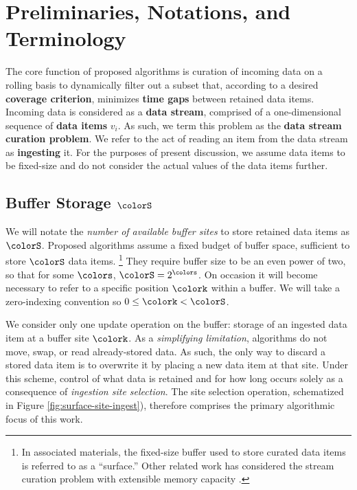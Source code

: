 \section{Preliminaries, Notations, and Terminology} \label{sec:notation}



The core function of proposed algorithms is curation of incoming data on a rolling basis to dynamically filter out a subset that, according to a desired \textbf{coverage criterion}, minimizes \textbf{time gaps} between retained data items.
Incoming data is considered as a \textbf{data stream}, comprised of a one-dimensional sequence of \textbf{data items} $v_i$.
As such, we term this problem as the \textbf{data stream curation problem}.
We refer to the act of reading an item from the data stream as \textbf{ingesting} it.
For the purposes of present discussion, we assume data items to be fixed-size and do not consider the actual values of the data items further.

\subsection{Buffer Storage $\colorS$}

We will notate the \textit{number of available buffer sites} to store retained data items as $\colorS$.
Proposed algorithms assume a fixed budget of buffer space, sufficient to store $\colorS$ data items.%
\footnote{%
In associated materials, the fixed-size buffer used to store curated data items is referred to as a ``surface.''
Other related work has considered the stream curation problem with extensible memory capacity \citep{moreno2024algorithms}.%
}
They require buffer size to be an even power of two, so that for some $\colors$, $\colorS = 2^{\colors}$.
On occasion it will become necessary to refer to a specific position $\colork$ within a buffer.
We will take a zero-indexing convention so $0 \leq \colork < \colorS$.

We consider only one update operation on the buffer: storage of an ingested data item at a buffer site $\colork$.
As a \textit{simplifying limitation}, algorithms do not move, swap, or read already-stored data.
As such, the only way to discard a stored data item is to overwrite it by placing a new data item at that site.
Under this scheme, control of what data is retained and for how long occurs solely as a consequence of \textit{ingestion site selection}.
The site selection operation, schematized in Figure \ref{fig:surface-site-ingest}), therefore comprises the primary algorithmic focus of this work.

